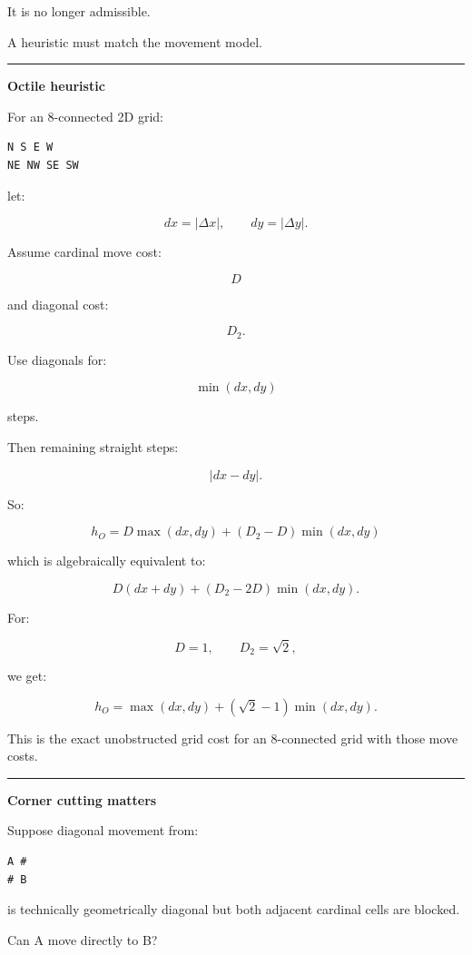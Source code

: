 It is no longer admissible.

A heuristic must match the movement model.

\begin{center}\rule{0.5\linewidth}{0.5pt}\end{center}

\textbf{Octile heuristic}

For an 8-connected 2D grid:

\begin{verbatim}
N S E W
NE NW SE SW
\end{verbatim}

let:

\[
dx=|\Delta x|,
\qquad
dy=|\Delta y|.
\]

Assume cardinal move cost:

\[
D
\]

and diagonal cost:

\[
D_2.
\]

Use diagonals for:

\[
\min(dx,dy)
\]

steps.

Then remaining straight steps:

\[
|dx-dy|.
\]

So:

\[
\boxed{
h_O
=
D\max(dx,dy)
+
(D_2-D)\min(dx,dy)
}
\]

which is algebraically equivalent to:

\[
D(dx+dy)
+
(D_2-2D)\min(dx,dy).
\]

For:

\[
D=1,
\qquad
D_2=\sqrt2,
\]

we get:

\[
\boxed{
h_O
=
\max(dx,dy)
+
(\sqrt2-1)\min(dx,dy).
}
\]

This is the exact unobstructed grid cost for an 8-connected grid with those move costs.

\begin{center}\rule{0.5\linewidth}{0.5pt}\end{center}

\textbf{Corner cutting matters}

Suppose diagonal movement from:

\begin{verbatim}
A #
# B
\end{verbatim}

is technically geometrically diagonal but both adjacent cardinal cells are blocked.

Can A move directly to B?

